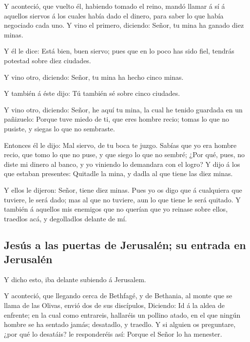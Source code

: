  Y aconteció, que vuelto él, habiendo tomado el reino,
mandó llamar á sí á aquellos siervos á los cuales había dado el dinero,
para saber lo que había negociado cada uno.  Y vino el
primero, diciendo: Señor, tu mina ha ganado diez minas.

 Y él le dice: Está bien, buen siervo; pues que en lo
poco has sido fiel, tendrás potestad sobre diez ciudades.

 Y vino otro, diciendo: Señor, tu mina ha hecho cinco
minas.

 Y también á éste dijo: Tú también sé sobre cinco
ciudades.

 Y vino otro, diciendo: Señor, he aquí tu mina, la cual
he tenido guardada en un pañizuelo:  Porque tuve miedo de
ti, que eres hombre recio; tomas lo que no pusiste, y siegas lo que no
sembraste.

 Entonces él le dijo: Mal siervo, de tu boca te juzgo.
Sabías que yo era hombre recio, que tomo lo que no puse, y que siego lo
que no sembré;  ¿Por qué, pues, no diste mi dinero al
banco, y yo viniendo lo demandara con el logro?  Y dijo á
los que estaban presentes: Quitadle la mina, y dadla al que tiene las
diez minas.

 Y ellos le dijeron: Señor, tiene diez minas.
 Pues yo os digo que á cualquiera que tuviere, le será
dado; mas al que no tuviere, aun lo que tiene le será quitado.
 Y también á aquellos mis enemigos que no querían que yo
reinase sobre ellos, traedlos acá, y degolladlos delante de mí.

\hypertarget{jesuxfas-a-las-puertas-de-jerusaluxe9n-su-entrada-en-jerusaluxe9n}{%
\subsection{Jesús a las puertas de Jerusalén; su entrada en
Jerusalén}\label{jesuxfas-a-las-puertas-de-jerusaluxe9n-su-entrada-en-jerusaluxe9n}}

 Y dicho esto, iba delante subiendo á Jerusalem.

 Y aconteció, que llegando cerca de Bethfagé, y de
Bethania, al monte que se llama de las Olivas, envió dos de sus
discípulos,  Diciendo: Id á la aldea de enfrente; en la
cual como entrareis, hallaréis un pollino atado, en el que ningún hombre
se ha sentado jamás; desatadlo, y traedlo.  Y si alguien
os preguntare, ¿por qué lo desatáis? le responderéis así: Porque el
Señor lo ha menester.

